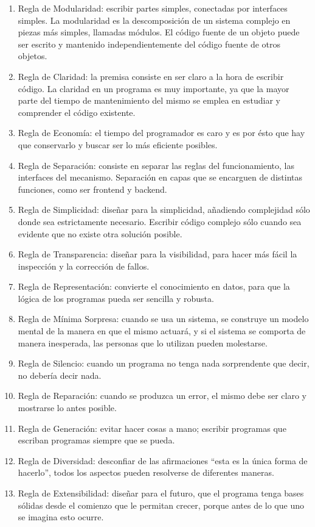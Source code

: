 \begin{enumerate}
\item Regla de Modularidad: escribir partes simples, conectadas por interfaces simples. La modularidad es la descomposición de un sistema complejo en piezas más simples, llamadas módulos. El código fuente de un objeto puede ser escrito y mantenido independientemente del código fuente de otros objetos. 
\item Regla de Claridad: la premisa consiste en ser claro a la hora de escribir código. La claridad en un programa es muy importante, ya que la mayor parte del tiempo de mantenimiento del mismo se emplea en estudiar y comprender el código existente. 
\item Regla de Economía: el tiempo del programador es caro y es por ésto que hay que conservarlo y buscar ser lo más eficiente posibles. 
\item Regla de Separación: consiste en separar las reglas del funcionamiento, las interfaces del mecanismo. Separación en capas que se encarguen de distintas funciones, como ser frontend y backend. 
\item Regla de Simplicidad: diseñar para la simplicidad, añadiendo complejidad sólo donde sea estrictamente necesario. Escribir código complejo sólo cuando sea evidente que no existe otra solución posible.
\item Regla de Transparencia: diseñar para la visibilidad, para hacer más fácil la inspección y la corrección de fallos.
\item Regla de Representación: convierte el conocimiento en datos, para que la lógica de los programas pueda ser sencilla y robusta.
\item Regla de Mínima Sorpresa: cuando se usa un sistema, se construye un modelo mental de la manera en que el mismo actuará, y si el sistema se comporta de manera inesperada, las personas que lo utilizan pueden molestarse.
\item Regla de Silencio: cuando un programa no tenga nada sorprendente que decir, no debería decir nada.
\item Regla de Reparación: cuando se produzca un error, el mismo debe ser claro y mostrarse lo antes posible.
\item Regla de Generación: evitar hacer cosas a mano; escribir programas que escriban programas siempre que se pueda.
\item Regla de Diversidad: desconfiar de las afirmaciones “esta es la única forma de hacerlo”, todos los aspectos pueden resolverse de diferentes maneras. 
\item Regla de Extensibilidad: diseñar para el futuro, que el programa tenga bases sólidas desde el comienzo que le permitan crecer, porque antes de lo que uno se imagina esto ocurre.
\end{enumerate}

